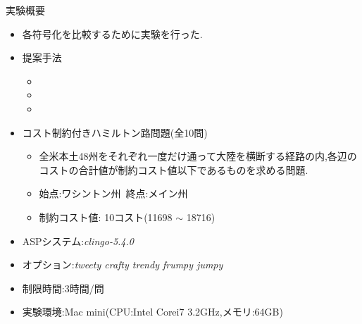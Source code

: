 \documentclass[dvipdfmx,11pt]{beamer}
\begin{document}
\begin{frame}{実験概要}
  \begin{itemize}
    \item 各符号化を比較するために実験を行った.
    \item 提案手法
      \begin{itemize}
      \item {}        
      \item {}
      \item {}        
      \end{itemize}
    \item コスト制約付きハミルトン路問題(全10問)
      \begin{itemize}
      \item 全米本土48州をそれぞれ一度だけ通って大陸を横断する経路の内,各辺のコストの合計値が制約コスト値以下であるものを求める問題.
      \item 始点:ワシントン州\ 終点:メイン州
      \item 制約コスト値: 10コスト(11698 $\sim$ 18716)
      \end{itemize}
    \item ASPシステム:\textit{clingo-5.4.0}
    \item オプション:\textit{tweety crafty trendy frumpy jumpy}
    \item 制限時間:3時間/問
    \item 実験環境:Mac mini(CPU:Intel Corei7 3.2GHz,メモリ:64GB)
  \end{itemize}
\end{frame}
\end{document}
